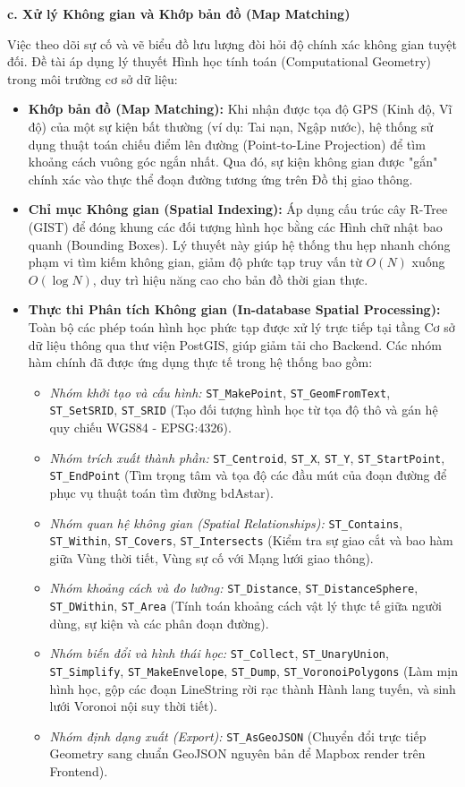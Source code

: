 \textbf{c. Xử lý Không gian và Khớp bản đồ (Map Matching)}

Việc theo dõi sự cố và vẽ biểu đồ lưu lượng đòi hỏi độ chính xác không gian tuyệt đối. Đề tài áp dụng lý thuyết Hình học tính toán (Computational Geometry) trong môi trường cơ sở dữ liệu:
\begin{itemize}
    \item \textbf{Khớp bản đồ (Map Matching):} Khi nhận được tọa độ GPS (Kinh độ, Vĩ độ) của một sự kiện bất thường (ví dụ: Tai nạn, Ngập nước), hệ thống sử dụng thuật toán chiếu điểm lên đường (Point-to-Line Projection) để tìm khoảng cách vuông góc ngắn nhất. Qua đó, sự kiện không gian được "gắn" chính xác vào thực thể đoạn đường tương ứng trên Đồ thị giao thông.
    \item \textbf{Chỉ mục Không gian (Spatial Indexing):} Áp dụng cấu trúc cây R-Tree (GIST) để đóng khung các đối tượng hình học bằng các Hình chữ nhật bao quanh (Bounding Boxes). Lý thuyết này giúp hệ thống thu hẹp nhanh chóng phạm vi tìm kiếm không gian, giảm độ phức tạp truy vấn từ $O(N)$ xuống $O(\log N)$, duy trì hiệu năng cao cho bản đồ thời gian thực.
    \item \textbf{Thực thi Phân tích Không gian (In-database Spatial Processing):} Toàn bộ các phép toán hình học phức tạp được xử lý trực tiếp tại tầng Cơ sở dữ liệu thông qua thư viện PostGIS, giúp giảm tải cho Backend. Các nhóm hàm chính đã được ứng dụng thực tế trong hệ thống bao gồm:
    \begin{itemize}
        \item \textit{Nhóm khởi tạo và cấu hình:} \texttt{ST\_MakePoint}, \texttt{ST\_GeomFromText}, \texttt{ST\_SetSRID}, \texttt{ST\_SRID} (Tạo đối tượng hình học từ tọa độ thô và gán hệ quy chiếu WGS84 - EPSG:4326).
        \item \textit{Nhóm trích xuất thành phần:} \texttt{ST\_Centroid}, \texttt{ST\_X}, \texttt{ST\_Y}, \texttt{ST\_StartPoint}, \texttt{ST\_EndPoint} (Tìm trọng tâm và tọa độ các đầu mút của đoạn đường để phục vụ thuật toán tìm đường bdAstar).
        \item \textit{Nhóm quan hệ không gian (Spatial Relationships):} \texttt{ST\_Contains}, \texttt{ST\_Within}, \texttt{ST\_Covers}, \texttt{ST\_Intersects} (Kiểm tra sự giao cắt và bao hàm giữa Vùng thời tiết, Vùng sự cố với Mạng lưới giao thông).
        \item \textit{Nhóm khoảng cách và đo lường:} \texttt{ST\_Distance}, \texttt{ST\_DistanceSphere}, \texttt{ST\_DWithin}, \texttt{ST\_Area} (Tính toán khoảng cách vật lý thực tế giữa người dùng, sự kiện và các phân đoạn đường).
        \item \textit{Nhóm biến đổi và hình thái học:} \texttt{ST\_Collect}, \texttt{ST\_UnaryUnion}, \texttt{ST\_Simplify}, \texttt{ST\_MakeEnvelope}, \texttt{ST\_Dump}, \texttt{ST\_VoronoiPolygons} (Làm mịn hình học, gộp các đoạn LineString rời rạc thành Hành lang tuyến, và sinh lưới Voronoi nội suy thời tiết).
        \item \textit{Nhóm định dạng xuất (Export):} \texttt{ST\_AsGeoJSON} (Chuyển đổi trực tiếp Geometry sang chuẩn GeoJSON nguyên bản để Mapbox render trên Frontend).
    \end{itemize}
\end{itemize}

